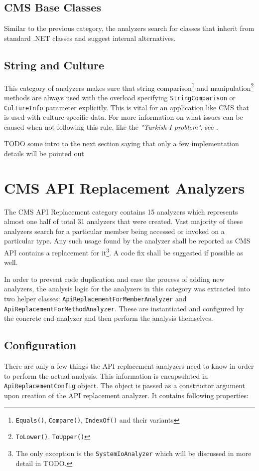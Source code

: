 \documentclass[
  digital, %
  table,   %
  lof,     %
  lot,     %
  oneside,
]{fithesis3}
\begin{document}
\subsection{CMS Base Classes}
Similar to the previous category, the analyzers search for classes that inherit from standard .NET classes and suggest internal alternatives.

\subsection{String and Culture}
This category of analyzers makes sure that string comparison\footnote{\texttt{Equals()}, \texttt{Compare()}, \texttt{IndexOf()} and their variants} and manipulation\footnote{\texttt{ToLower()}, \texttt{ToUpper()}} methods are always used with the overload specifying \texttt{StringComparison} or \texttt{CultureInfo} parameter explicitly. This is vital for an application like CMS that is used with culture specific data. For more information on what issues can be caused when not following this rule, like the \textit{"Turkish-I problem"}, see \cite{best-practices-for-using-strings-in-dot-net}. 

TODO some intro to the next section saying that only a few implementation details will be pointed out

\section{CMS API Replacement Analyzers}
The CMS API Replacement category contains 15 analyzers which represents almost one half of total 31 analyzers that were created. Vast majority of these analyzers search for a particular member being accessed or invoked on a particular type. Any such usage found by the analyzer shall be reported as CMS API contains a replacement for it\footnote{The only exception is the \texttt{SystemIoAnalyzer} which will be discussed in more detail in TODO.}. A code fix shall be suggested if possible as well.

In order to prevent code duplication and ease the process of adding new analyzers, the analysis logic for the analyzers in this category was extracted into two helper classes: \texttt{ApiReplacementForMemberAnalyzer} and \texttt{ApiReplacementForMethodAnalyzer}. These are instantiated and configured by the concrete end-analyzer and then perform the analysis themselves.

\subsection{Configuration}
There are only a few things the API replacement analyzers need to know in order to perform the actual analysis. This information is encapsulated in \texttt{ApiReplacementConfig} object. The object is passed as a constructor argument upon creation of the API replacement analyzer. It contains following properties:
\end{document}
